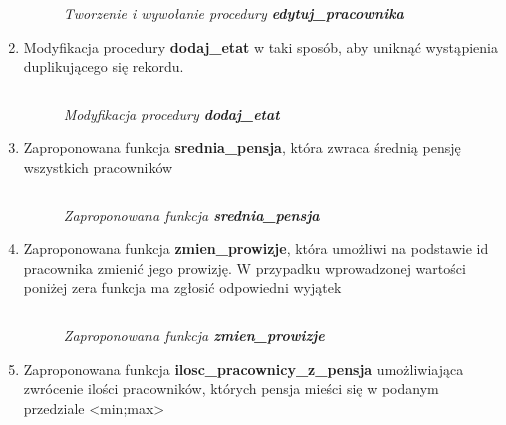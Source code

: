 \documentclass{article}
\begin{document}
\begin{enumerate}
		\begin{figure}[H]
			\centering
			\caption{\textit{Tworzenie i wywołanie procedury \textbf{edytuj\_pracownika}}}
		\end{figure}

\item Modyfikacja procedury \textbf{dodaj\_etat} w taki sposób, aby uniknąć wystąpienia duplikującego się rekordu.

	\begin{lstlisting}[style=SQL, caption=\textit{Modyfikacja procedury \textbf{dodaj\_etat}}]
	\end{lstlisting}

		\begin{figure}[H]
			\centering
			\caption{\textit{Modyfikacja procedury \textbf{dodaj\_etat}}}
		\end{figure}

\item Zaproponowana funkcja \textbf{srednia\_pensja}, która zwraca średnią pensję wszystkich pracowników
	
	\begin{lstlisting}[style=SQL, caption=\textit{Zaproponowana funckja \textbf{srednia\_pensja}}]
	\end{lstlisting}

		\begin{figure}[H]
			\centering
			\caption{\textit{Zaproponowana funkcja \textbf{srednia\_pensja}}}
		\end{figure}

\item Zaproponowana funkcja \textbf{zmien\_prowizje}, która umożliwi na podstawie id pracownika zmienić jego prowizję. W przypadku wprowadzonej wartości poniżej zera funkcja ma zgłosić odpowiedni wyjątek

	\begin{lstlisting}[style=SQL, caption=\textit{Zaproponowana funkcja \textbf{zmien\_prowizje}}]
	\end{lstlisting}

	\begin{figure}[H]
		\centering
		\caption{\textit{Zaproponowana funkcja \textbf{zmien\_prowizje}}}
	\end{figure}

\item Zaproponowana funkcja \textbf{ilosc\_pracownicy\_z\_pensja} umożliwiająca zwrócenie ilości pracowników, których pensja mieści się w podanym przedziale <min;max>

	\begin{lstlisting}[style=SQL, caption=\textit{Zaproponowana funkcja \textbf{ilosc\_pracownicy\_z\_pensja}}]
	\end{lstlisting}


\end{enumerate}
\end{document}
